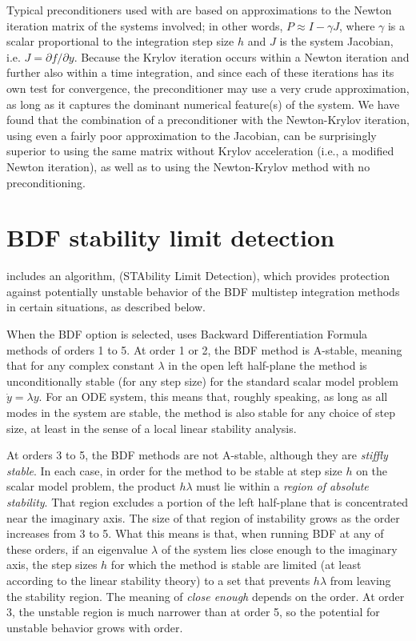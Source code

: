 Typical preconditioners used with {\cvodes} are based on
approximations to the Newton iteration matrix of the systems involved;
in other words, $P \approx I - \gamma J$, where $\gamma$ is a scalar proportional to the
integration step size $h$ and $J$ is the system Jacobian, i.e. $J = \partial f / \partial y$.
Because the Krylov iteration occurs within a Newton iteration and further
also within a time integration, and since each of these iterations has
its own test for convergence, the preconditioner may use a very crude
approximation, as long as it captures the dominant numerical
feature(s) of the system.  We have found that the combination of a
preconditioner with the Newton-Krylov iteration, using even a fairly
poor approximation to the Jacobian, can be surprisingly superior to
using the same matrix without Krylov acceleration (i.e., a modified
Newton iteration), as well as to using the Newton-Krylov method with
no preconditioning.


\section{BDF stability limit detection}\label{s:bdf_stab}

{\cvodes} includes an algorithm, {\stald} (STAbility Limit Detection),
which provides protection against potentially unstable behavior of the 
BDF multistep integration methods in certain situations, as described below.

When the BDF option is selected, {\cvodes} uses Backward Differentiation 
Formula methods of orders 1 to 5.  At order 1 or 2, the BDF
method is A-stable, meaning that for any complex constant $\lambda$ in
the open left half-plane the method is unconditionally stable (for
any step size) for the standard scalar model problem ${\dot y} = \lambda y$.
For an ODE system, this means that, roughly speaking, as long as all
modes in the system are stable, the method is also stable for any
choice of step size, at least in the sense of a local linear stability
analysis.

At orders 3 to 5, the BDF methods are not A-stable, although they are
{\em stiffly stable}. In each case, in order for the method to be stable
at step size $h$ on the scalar model problem, the product $h\lambda$ must
lie within a {\em region of absolute stability}. 
That region excludes a portion of the left half-plane that is concentrated 
near the imaginary axis.  The size of that region of instability grows as the order
increases from 3 to 5.  What this means is that, when running BDF at
any of these orders, if an eigenvalue $\lambda$ of the system lies close
enough to the imaginary axis, the step sizes $h$ for which the method is
stable are limited (at least according to the linear stability theory)
to a set that prevents $h\lambda$ from leaving the stability region.
The meaning of {\em close enough} depends on the order.  
At order 3, the unstable region is much narrower than at order 5, 
so the potential for unstable behavior grows with order.

